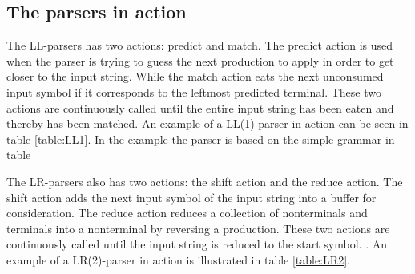 \subsection{The parsers in action} 
The LL-parsers has two actions: predict and match. The predict action is used when the parser is trying to guess the next production to apply in order to get closer to the input string. While the match action eats the next unconsumed input symbol if it corresponds to the leftmost predicted terminal. These two actions are continuously called until the entire input string has been eaten and thereby has been matched. An example of a LL(1) parser in action can be seen in table \ref{table:LL1}. In the example the parser is based on the simple grammar in table 

\begin{centering}
\begin{ebnf}
\end{ebnf}
\end{centering}
The LR-parsers also has two actions: the shift action and the reduce action. The shift action adds the next input symbol of the input string into a buffer for consideration. The reduce action reduces a collection of nonterminals and terminals into a nonterminal by reversing a production. These two actions are
continuously called until the input string is reduced to the start symbol. \cite{LL(1)andLR(2)inaction}. An example of a LR(2)-parser in action is illustrated in table \ref{table:LR2}.

